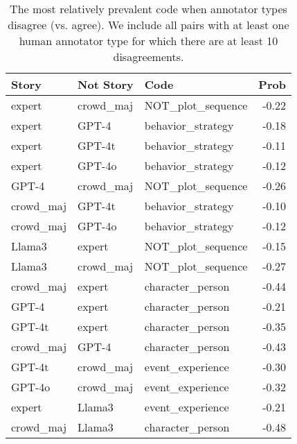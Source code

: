 \begin{table}
\caption{The most relatively prevalent code when annotator types disagree (vs. agree). We include all pairs with at least one human annotator type for which there are at least 10 disagreements.}
\label{tab:cross-annotator-dis}
\begin{tabular}{lllr}
\toprule
Story & Not Story & Code & Prob \\
\midrule
expert & crowd\_maj & NOT\_plot\_sequence & -0.22 \\
expert & GPT-4 & behavior\_strategy & -0.18 \\
expert & GPT-4t & behavior\_strategy & -0.11 \\
expert & GPT-4o & behavior\_strategy & -0.12 \\
GPT-4 & crowd\_maj & NOT\_plot\_sequence & -0.26 \\
crowd\_maj & GPT-4t & behavior\_strategy & -0.10 \\
crowd\_maj & GPT-4o & behavior\_strategy & -0.12 \\
Llama3 & expert & NOT\_plot\_sequence & -0.15 \\
Llama3 & crowd\_maj & NOT\_plot\_sequence & -0.27 \\
crowd\_maj & expert & character\_person & -0.44 \\
GPT-4 & expert & character\_person & -0.21 \\
GPT-4t & expert & character\_person & -0.35 \\
crowd\_maj & GPT-4 & character\_person & -0.43 \\
GPT-4t & crowd\_maj & event\_experience & -0.30 \\
GPT-4o & crowd\_maj & event\_experience & -0.32 \\
expert & Llama3 & event\_experience & -0.21 \\
crowd\_maj & Llama3 & character\_person & -0.48 \\
\bottomrule
\end{tabular}
\end{table}

